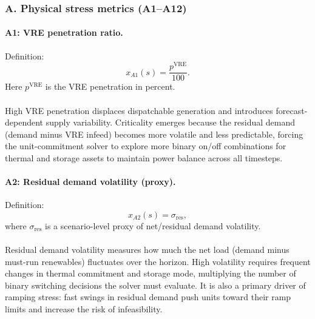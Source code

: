 \documentclass{article}
\begin{document}

\subsubsection*{A. Physical stress metrics (A1--A12)}

\paragraph{A1: VRE penetration ratio.}
Definition:
\begin{equation}
x_{A1}(s)=\frac{p^{\mathrm{VRE}}}{100}.
\end{equation}
Here $p^{\mathrm{VRE}}$ is the VRE penetration in percent.

\paragraph{}High VRE penetration displaces dispatchable generation and introduces forecast-dependent supply variability. Criticality emerges because the residual demand (demand minus VRE infeed) becomes more volatile and less predictable, forcing the unit-commitment solver to explore more binary on/off combinations for thermal and storage assets to maintain power balance across all timesteps.

\paragraph{A2: Residual demand volatility (proxy).}
Definition:
\begin{equation}
x_{A2}(s)=\sigma_{\mathrm{res}},
\end{equation}
where $\sigma_{\mathrm{res}}$ is a scenario-level proxy of net/residual demand volatility.

\paragraph{}Residual demand volatility measures how much the net load (demand minus must-run renewables) fluctuates over the horizon. High volatility requires frequent changes in thermal commitment and storage mode, multiplying the number of binary switching decisions the solver must evaluate. It is also a primary driver of ramping stress: fast swings in residual demand push units toward their ramp limits and increase the risk of infeasibility.
\end{document}
